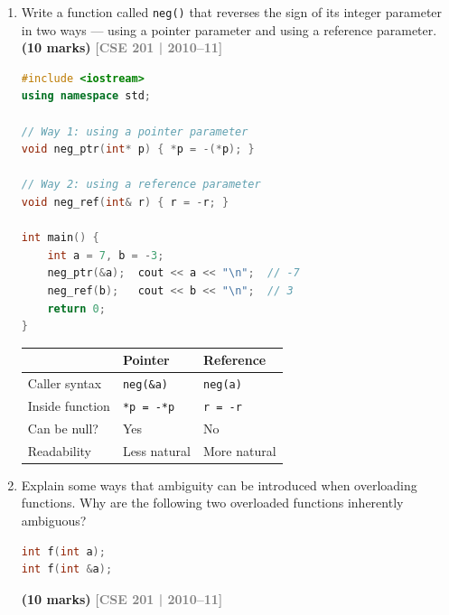 \documentclass[12pt,a3paper]{article}
\newcommand{\yr}[1]{\hfill\textcolor{gray}{\small\textbf{[#1]}}}
\newcommand{\mk}[1]{\textcolor{orange!70!black}{\small\textbf{(#1 marks)}}}
\begin{document}
\begin{enumerate}
\begin{tcolorbox}[enhanced,breakable,ansbox,colback=cC!4,colframe=cC,
  boxrule=0.8pt,arc=5pt,
  title={\textbf{Answer --- Namespace and global namespace problems}},
  fonttitle=\bfseries\color{white},colbacktitle=cC]
\textbf{Best practice:} Use \texttt{std::cout} or restrict to
\texttt{using std::cout;} in small scopes.

\end{tcolorbox}


\item Write a function called \texttt{neg()} that reverses the sign of its integer parameter in two ways --- using a pointer parameter and using a reference parameter. \mk{10}
\yr{CSE 201 | 2010--11}


\begin{tcolorbox}[enhanced,breakable,ansbox,colback=cC!4,colframe=cC,
  boxrule=0.8pt,arc=5pt,
  title={\textbf{Answer --- neg() with pointer and reference}},
  fonttitle=\bfseries\color{white},colbacktitle=cC]

\begin{lstlisting}[language=C++]
#include <iostream>
using namespace std;

// Way 1: using a pointer parameter
void neg_ptr(int* p) { *p = -(*p); }

// Way 2: using a reference parameter
void neg_ref(int& r) { r = -r; }

int main() {
    int a = 7, b = -3;
    neg_ptr(&a);  cout << a << "\n";  // -7
    neg_ref(b);   cout << b << "\n";  // 3
    return 0;
}
\end{lstlisting}

\begin{center}
\small
\begin{tabular}{@{}lll@{}}
\toprule
& \textbf{Pointer} & \textbf{Reference} \\ \midrule
Caller syntax   & \texttt{neg(\&a)}  & \texttt{neg(a)} \\
Inside function & \texttt{*p = -*p} & \texttt{r = -r} \\
Can be null?    & Yes               & No \\
Readability     & Less natural      & More natural \\
\bottomrule
\end{tabular}
\end{center}

\end{tcolorbox}

\item Explain some ways that ambiguity can be introduced when overloading functions. Why are the following two overloaded functions inherently ambiguous?
\begin{lstlisting}[language=C++]
int f(int a);
int f(int &a);
\end{lstlisting}
\mk{10}
\yr{CSE 201 | 2010--11}



\end{enumerate}
\end{document}
